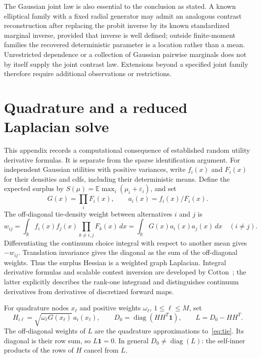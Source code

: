 \documentclass[11pt]{amsart}
\theoremstyle{definition}\newtheorem{example}[theorem]{Example}
\theoremstyle{remark}\newtheorem{remark}[theorem]{Remark}
\newcommand{\R}{\mathbb R}\newcommand{\E}{\mathbb E}\newcommand{\Prob}{\mathbb P}
\newcommand{\one}{\mathbf 1}\newcommand{\diag}{\operatorname{diag}}
\begin{document}
The Gaussian joint law is also essential to the conclusion as stated. A known elliptical family with a fixed radial generator may admit an analogous contrast reconstruction after replacing the probit inverse by its known standardized marginal inverse, provided that inverse is well defined; outside finite-moment families the recovered deterministic parameter is a location rather than a mean. Unrestricted dependence or a collection of Gaussian pairwise marginals does not by itself supply the joint contrast law. Extensions beyond a specified joint family therefore require additional observations or restrictions.

\appendix
\section{Quadrature and a reduced Laplacian solve}\label{app:quadrature}
This appendix records a computational consequence of established random utility derivative formulas. It is separate from the sparse identification argument. For independent Gaussian utilities with positive variances, write $f_i(x)$ and $F_i(x)$ for their densities and cdfs, including their deterministic means. Define the expected surplus by $S(\mu)=\E\max_i(\mu_i+\varepsilon_i)$, and set
\[
 G(x)=\prod_iF_i(x),\qquad a_i(x)=f_i(x)/F_i(x).
\]
The off-diagonal tie-density weight between alternatives $i$ and $j$ is
\begin{equation}\label{eq:tie}
 w_{ij}=\int_\R f_i(x)f_j(x)\prod_{k\ne i,j}F_k(x)\,dx
       =\int_\R G(x)a_i(x)a_j(x)\,dx\quad(i\ne j).
\end{equation}
Differentiating the continuum choice integral with respect to another mean gives $-w_{ij}$. Translation invariance gives the diagonal as the sum of the off-diagonal weights. Thus the surplus Hessian is a weighted graph Laplacian. Integral derivative formulas and scalable contest inversion are developed by Cotton~\cite{cotton2021,cotton2026}; the latter explicitly describes the rank-one integrand and distinguishes continuum derivatives from derivatives of discretized forward maps.

For quadrature nodes $x_\ell$ and positive weights $\omega_\ell$, $1\leq\ell\leq M$, set
\begin{equation}\label{eq:H}
 H_{i\ell}=\sqrt{\omega_\ell G(x_\ell)}\,a_i(x_\ell),\qquad
 D_0=\diag(HH^T\one),\qquad L=D_0-HH^T.
\end{equation}
The off-diagonal weights of $L$ are the quadrature approximations to~\eqref{eq:tie}. Its diagonal is their row sum, so $L\one=0$. In general $D_0\ne\diag(L)$: the self-inner products of the rows of $H$ cancel from $L$.
\end{document}

